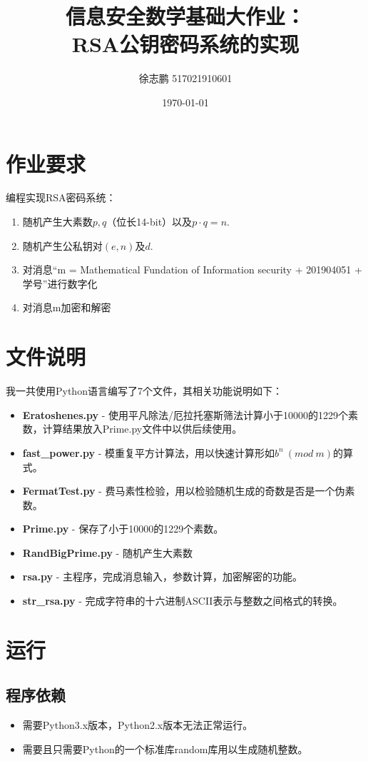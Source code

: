 \documentclass[a4paper]{article}
\author{徐志鹏 517021910601}
\date{\today}
\title{信息安全数学基础大作业：\\RSA公钥密码系统的实现}
\begin{document}
\maketitle
\section{作业要求}
编程实现RSA密码系统：
\begin{enumerate}
    \item 随机产生大素数$p, q$（位长14-bit）以及$p\cdot q=n$.
    \item 随机产生公私钥对$(e, n)$及$d$.
    \item 对消息“m = Mathematical Fundation of Information security + 201904051 + 学号”进行数字化
    \item 对消息m加密和解密
\end{enumerate}
\section{文件说明}
我一共使用Python语言编写了7个文件，其相关功能说明如下：
\begin{itemize}
    \item[\checkmark] \textbf{Eratoshenes.py} - 使用平凡除法/厄拉托塞斯筛法计算小于10000的1229个素数，计算结果放入{Prime.py}文件中以供后续使用。
    \item[\checkmark] \textbf{fast\_power.py} - 模重复平方计算法，用以快速计算形如$b^n\ (mod\ m)$的算式。
    \item[\checkmark] \textbf{FermatTest.py} - 费马素性检验，用以检验随机生成的奇数是否是一个伪素数。 
    \item[\checkmark] \textbf{Prime.py} - 保存了小于10000的1229个素数。
    \item[\checkmark] \textbf{RandBigPrime.py} - 随机产生大素数
    \item[\checkmark] \textbf{rsa.py} - 主程序，完成消息输入，参数计算，加密解密的功能。
    \item[\checkmark] \textbf{str\_rsa.py} - 完成字符串的十六进制ASCII表示与整数之间格式的转换。
\end{itemize}
\section{运行}
\subsection{程序依赖}
\begin{itemize}
    \item 需要Python3.x版本，Python2.x版本无法正常运行。
    \item 需要且只需要Python的一个标准库random库用以生成随机整数。
\end{itemize}
\end{document}
